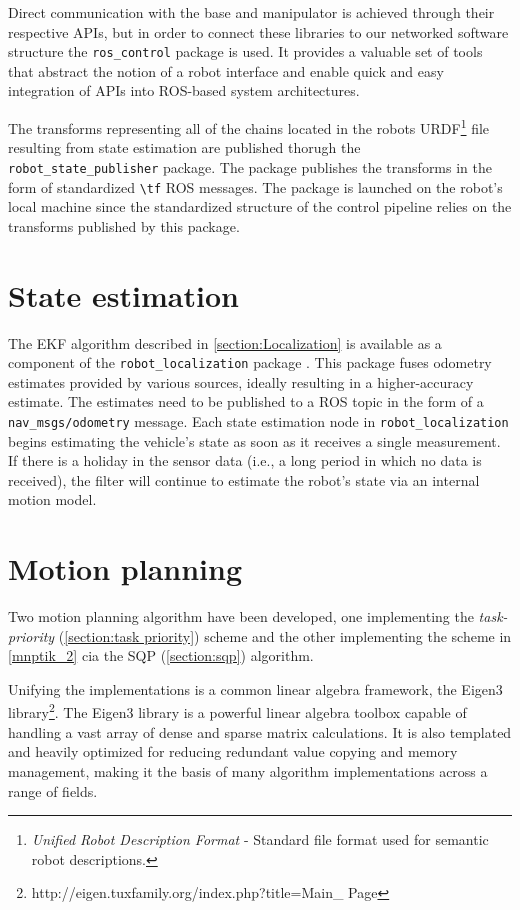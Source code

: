 \documentclass[times, utf8, diplomski, english]{fer}
\begin{document}
Direct communication with the base and manipulator is achieved through their respective APIs, but in order to connect these libraries to our networked software structure the \verb|ros_control| package is used. 
It provides a valuable set of tools that abstract the notion of a robot interface and enable quick and easy integration of APIs into ROS-based system architectures.

The transforms representing all of the chains located in the robots URDF\footnote{\textit{Unified Robot Description Format} - Standard file format used for semantic robot descriptions.} file resulting from state estimation are published thorugh the \verb|robot_state_publisher| package. The package publishes the transforms in the form of standardized \verb|\tf| ROS messages.
The package is launched on the robot's local machine since the standardized structure of the control pipeline relies on the transforms published by this package.

\section{State estimation}\label{section:code state estimation}
The EKF algorithm described in \ref{section:Localization} is available as a component of the \verb|robot_localization| package \citep{MooreStouchKeneralizedEkf2014}.
This package fuses odometry estimates provided by various sources, ideally resulting in a higher-accuracy estimate.
The estimates need to be published to a ROS topic in the form of a \verb|nav_msgs/odometry| message.
Each state estimation node in \verb|robot_localization| begins estimating the vehicle’s state as soon as it receives a single measurement. If there is a holiday in the sensor data (i.e., a long period in which no data is received), the filter will continue to estimate the robot’s state via an internal motion model.

\section{Motion planning}\label{section:code motion planning}
Two motion planning algorithm have been developed, one implementing the \textit{task-priority} (\ref{section:task priority}) scheme and the other implementing the scheme in \ref{mnptik_2} cia the SQP (\ref{section:sqp}) algorithm.

Unifying the implementations is a common linear algebra framework, the Eigen3 library\footnote{http://eigen.tuxfamily.org/index.php?title=Main\_ Page}.
The Eigen3 library is a powerful linear algebra toolbox capable of handling a vast array of dense and sparse matrix calculations.
It is also templated and heavily optimized for reducing redundant value copying and memory management, making it the basis of many algorithm implementations across a range of fields.
\end{document}
